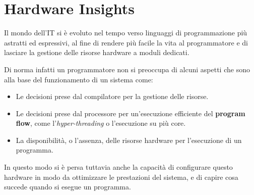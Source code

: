 \chapter{Hardware Insights}
\label{chap:hardware-insights}
Il mondo dell'IT si è evoluto nel tempo verso linguaggi di programmazione più astratti ed espressivi, al fine di rendere più facile la vita al programmatore e di lasciare la gestione delle risorse hardware a moduli dedicati.

Di norma infatti un programmatore non si preoccupa di alcuni aspetti che sono alla base del funzionamento di un sistema come:
\begin{itemize}
    \item Le decisioni prese dal compilatore per la gestione delle risorse.
    \item Le decisioni prese dal processore per un'esecuzione efficiente del \textbf{program flow}, come l'\textit{hyper-threading} o l'esecuzione su più core.
    \item La disponibilità, o l'assenza, delle risorse hardware per l'esecuzione di un programma.
\end{itemize}
In questo modo si è persa tuttavia anche la capacità di configurare questo hardware in modo da ottimizzare le prestazioni del sistema, e di capire cosa succede quando si esegue un programma. 

